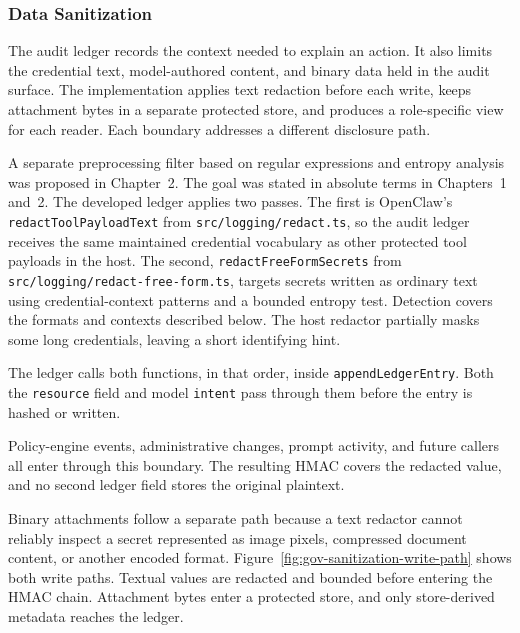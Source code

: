 \FloatBarrier


\subsubsection{Data Sanitization}
\label{sec:gov-ledger-sanitization}

The audit ledger records the context needed to explain an action. It also limits the credential text, model-authored content, and binary data held in the audit surface. The implementation applies text redaction before each write, keeps attachment bytes in a separate protected store, and produces a role-specific view for each reader. Each boundary addresses a different disclosure path.

{\color{red}\setlength{\emergencystretch}{3em}A separate preprocessing filter based on regular expressions and entropy
analysis was proposed in Chapter~2. The goal was stated in absolute terms in
Chapters~1 and~2. The developed ledger applies two passes. The first is
OpenClaw's \texttt{redactToolPayloadText} from \texttt{src/logging/redact.ts},
so the audit ledger receives the same maintained credential vocabulary as other
protected tool payloads in the host. The second,
\texttt{redactFreeFormSecrets} from
\texttt{src/logging/\allowbreak redact-free-form.ts}, targets secrets written as
ordinary text using credential-context patterns and a bounded entropy test.
Detection covers the formats and contexts described below. The host redactor
partially masks some long credentials, leaving a short identifying hint.

The ledger calls both functions, in that order, inside
\texttt{appendLedgerEntry}. Both the \texttt{resource} field and model
\texttt{intent} pass through them before the entry is hashed or written.} Policy-engine events, administrative changes, prompt activity, and future callers all enter through this boundary. The resulting HMAC covers the redacted value, and no second ledger field stores the original plaintext.

Binary attachments follow a separate path because a text redactor cannot reliably inspect a secret represented as image pixels, compressed document content, or another encoded format. Figure~\ref{fig:gov-sanitization-write-path} shows both write paths. Textual values are redacted and bounded before entering the HMAC chain. Attachment bytes enter a protected store, and only store-derived metadata reaches the ledger.

